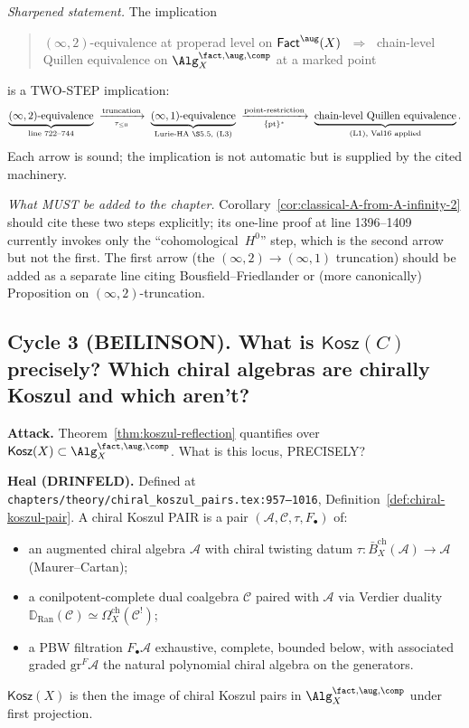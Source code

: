 \documentclass[11pt]{article}
\theoremstyle{definition}
\newcommand{\Omegach}{\Omega^{\mathrm{ch}}}
\newcommand{\Kosz}{\mathsf{Kosz}}
\newcommand{\Fact}{\mathsf{Fact}}
\newcommand{\Ran}{\mathrm{Ran}}
\newcommand{\cA}{\mathcal{A}}
\newcommand{\cC}{\mathcal{C}}
\begin{document}
\emph{Sharpened statement.} The implication
\begin{quote}
$(\infty,2)$-equivalence at properad level on $\Fact^{\aug}(X)$
$\;\Longrightarrow\;$ chain-level Quillen equivalence on
$\Alg^{\fact,\aug,\comp}_X$ at a marked point
\end{quote}
is a TWO-STEP implication:
\[
\underbrace{(\infty,2)\text{-equivalence}}_{\text{line~722--744}}
\;\xrightarrow[\tau_{\leq 0}]{\text{truncation}}\;
\underbrace{(\infty,1)\text{-equivalence}}_{\text{Lurie-HA~\S5.5, (L3)}}
\;\xrightarrow[\{\mathrm{pt}\}^*]{\text{point-restriction}}\;
\underbrace{\text{chain-level Quillen equivalence}}_{\text{(L1), Val16 applied}}.
\]
Each arrow is sound; the implication is not automatic but is
supplied by the cited machinery.

\emph{What MUST be added to the chapter.} Corollary~\ref{cor:classical-A-from-A-infinity-2}
should cite these two steps explicitly; its one-line proof at
line 1396--1409 currently invokes only the ``cohomological~$H^0$''
step, which is the second arrow but not the first. The first arrow
(the $(\infty,2)\to(\infty,1)$ truncation) should be added as a
separate line citing Bousfield--Friedlander or (more
canonically) \cite[Chapter I.3]{GR17} Proposition on
$(\infty,2)$-truncation.

\subsection*{Cycle 3 (BEILINSON). What is $\Kosz(C)$ precisely?
Which chiral algebras are chirally Koszul and which aren't?}

\textbf{Attack.} Theorem~\ref{thm:koszul-reflection} quantifies over
$\Kosz(X)\subset\Alg^{\fact,\aug,\comp}_X$. What is this locus,
PRECISELY?

\textbf{Heal (DRINFELD).} Defined at
\texttt{chapters/theory/chiral\_koszul\_pairs.tex:957--1016},
Definition~\ref{def:chiral-koszul-pair}. A chiral Koszul PAIR is
a pair $(\cA,\cC,\tau,F_\bullet)$ of:
\begin{itemize}
\item an augmented chiral algebra $\cA$ with chiral twisting datum
  $\tau\colon\bar B^{\mathrm{ch}}_X(\cA)\to\cA$ (Maurer--Cartan);
\item a conilpotent-complete dual coalgebra $\cC$ paired with $\cA$
  via Verdier duality $\mathbb{D}_{\Ran}(\cC)\simeq\Omegach_X(\cC^!)$;
\item a PBW filtration $F_\bullet\cA$ exhaustive, complete,
  bounded below, with associated graded $\mathrm{gr}^F\cA$ the
  natural polynomial chiral algebra on the generators.
\end{itemize}
$\Kosz(X)$ is then the image of chiral Koszul pairs in
$\Alg^{\fact,\aug,\comp}_X$ under first projection.
\end{document}
